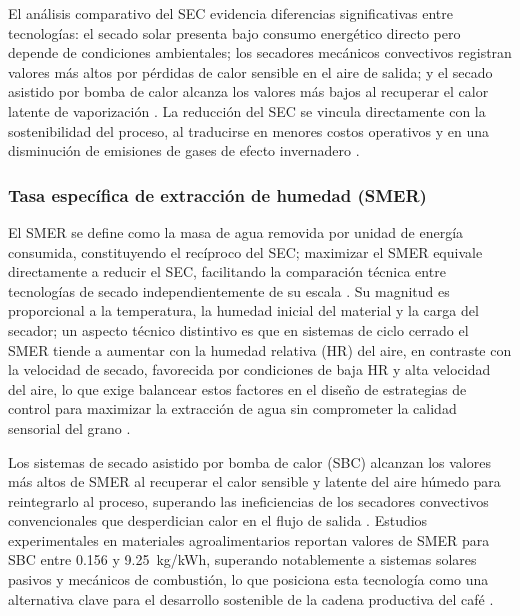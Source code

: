 El análisis comparativo del SEC evidencia diferencias significativas entre 
tecnologías: el secado solar presenta bajo consumo energético directo pero depende 
de condiciones ambientales; los secadores mecánicos convectivos registran valores 
más altos por pérdidas de calor sensible en el aire de salida; y el secado asistido 
por bomba de calor alcanza los valores más bajos al recuperar el calor latente de 
vaporización \parencite{cansee_effect_2026, burdo_energy-efficient_2025, 
ibrahim_design_2025, gomez-daza_innovacion_2023}. La reducción del SEC se vincula 
directamente con la sostenibilidad del proceso, al traducirse en menores costos 
operativos y en una disminución de emisiones de gases de efecto invernadero 
\parencite{cansee_effect_2026, kaveh_comparative_2023}.

\subsubsection{Tasa específica de extracción de humedad (SMER)}

El SMER se define como la masa de agua removida por unidad de energía consumida, 
constituyendo el recíproco del SEC; maximizar el SMER equivale directamente a 
reducir el SEC, facilitando la comparación técnica entre tecnologías de secado 
independientemente de su escala \parencite{burdo_energy-efficient_2025, 
gomez-daza_innovacion_2023, hendrarsakti_thermal_2019, 
leonardo_barcelos_mateus_modeling_2021}. Su magnitud es proporcional a la 
temperatura, la humedad inicial del material y la carga del secador; un aspecto 
técnico distintivo es que en sistemas de ciclo cerrado el SMER tiende a aumentar 
con la humedad relativa (HR) del aire, en contraste con la velocidad de secado, 
favorecida por condiciones de baja HR y alta velocidad del aire, lo que exige 
balancear estos factores en el diseño de estrategias de control para maximizar la 
extracción de agua sin comprometer la calidad sensorial del grano 
\parencite{gomez-daza_innovacion_2023}.

Los sistemas de secado asistido por bomba de calor (SBC) alcanzan los valores más 
altos de SMER al recuperar el calor sensible y latente del aire húmedo para 
reintegrarlo al proceso, superando las ineficiencias de los secadores convectivos 
convencionales que desperdician calor en el flujo de salida 
\parencite{burdo_energy-efficient_2025, abbaspour-gilandeh_effect_2021, 
chojnacka_improvements_2021}. Estudios experimentales en materiales agroalimentarios 
reportan valores de SMER para SBC entre 0.156 y 9.25~kg/kWh, superando 
notablemente a sistemas solares pasivos y mecánicos de combustión, lo que posiciona 
esta tecnología como una alternativa clave para el desarrollo sostenible de la 
cadena productiva del café \parencite{bobbo_technological_2024, gomez-daza_innovacion_2023, 
burdo_energy-efficient_2025}.

